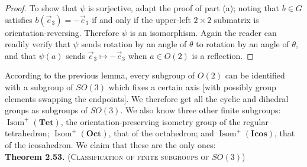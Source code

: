 \documentclass[leqno]{book}
\begin{document}
\begin{proof}
To show that $\psi$ is surjective, adapt the proof of part (a); noting that $b\in G$ satisfies $b(\vec e_3)=-\vec e_3$ if and only if the upper-left $2\times 2$ submatrix is orientation-reversing.  Therefore $\psi$ is an isomorphism.  Again the reader can readily verify that $\psi$ sends rotation by an angle of $\theta$ to rotation by an angle of $\theta$, and that $\psi(a)$ sends $\vec e_3\mapsto-\vec e_3$ when $a\in O(2)$ is a reflection.
\end{proof}

\noindent According to the previous lemma, every subgroup of $O(2)$ can be identified with a subgroup of $SO(3)$ which fixes a certain axis [with possibly group elements swapping the endpoints].  We therefore get all the cyclic and dihedral groups as subgroups of $SO(3)$.  We also know three other finite subgroups: $\operatorname{Isom}^+(\mathbf{Tet})$, the orientation-preserving isometry group of the regular tetrahedron; $\operatorname{Isom}^+(\mathbf{Oct})$, that of the octahedron; and $\operatorname{Isom}^+(\mathbf{Icos})$, that of the icosahedron.  We claim that these are the only ones:\\

\noindent\textbf{Theorem 2.53.} \textsc{(Classification of finite subgroups of $SO(3)$)}
\end{document}
